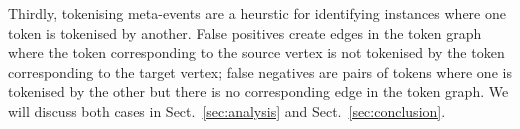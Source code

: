 Thirdly, tokenising meta-events are a heurstic for identifying
instances where one token is tokenised by another.  False positives
create edges in the token graph where the token corresponding to the
source vertex is not tokenised by the token corresponding to the
target vertex; false negatives are pairs of tokens where one is
tokenised by the other but there is no corresponding edge in the token
graph.  We will discuss both cases in Sect.~\ref{sec:analysis} and
Sect.~\ref{sec:conclusion}.
